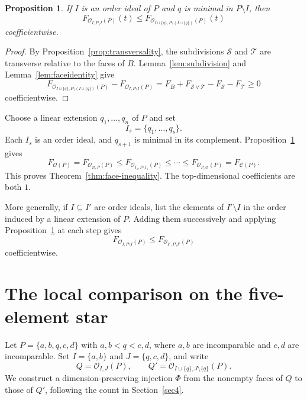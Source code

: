 \documentclass[a4paper,12pt]{amsart}
\newtheorem{proposition}[theorem]{Proposition}
\theoremstyle{definition}
\theoremstyle{remark}
\newcommand{\OO}{\mathcal O}
\newcommand{\CC}{\mathcal C}
\begin{document}
\begin{proposition}\label{prop:step}
If $I$ is an order ideal of $P$ and $q$ is minimal in $P\setminus I$, then
\[
 F_{\OO_{I,P\setminus I}(P)}(t)  \leq  F_{\OO_{I\cup\{q\},P\setminus(I\cup\{q\})}(P)}(t)
\]
coefficientwise.
\end{proposition}

\begin{proof}
By Proposition~\ref{prop:transversality}, the subdivisions $\mathcal S$ and $\mathcal T$ are transverse relative to the faces of $B$.
Lemma~\ref{lem:subdivision} and Lemma~\ref{lem:faceidentity} give
\[
 F_{\OO_{I\cup\{q\},P\setminus(I\cup\{q\})}(P)}-F_{\OO_{I,P\setminus I}(P)}
 =  F_B+F_{\mathcal S\vee\mathcal T}  -F_{\mathcal S}-F_{\mathcal T}  \geq0
\]
coefficientwise.
\end{proof}

Choose a linear extension $q_1,\ldots,q_n$ of $P$ and set
\[
 I_s=\{q_1,\ldots,q_s\}.
\]
Each $I_s$ is an order ideal, and $q_{s+1}$ is minimal in its complement.
Proposition~\ref{prop:step} gives
\[
 F_{\OO(P)}  =  F_{\OO_{\varnothing,P}(P)}  \leq  F_{\OO_{I_1,P\setminus I_1}(P)}  
 \leq\cdots\leq  F_{\OO_{P,\varnothing}(P)}  = F_{\CC(P)}.
\]
This proves Theorem~\ref{thm:face-inequality}.
The top-dimensional coefficients are both $1$.

More generally, if $I\subseteq I'$ are order ideals, list the elements of $I'\setminus I$ in the order induced by a linear extension of $P$.
Adding them successively and applying Proposition~\ref{prop:step} at each step gives
\[
 F_{\OO_{I,P\setminus I}(P)}\leq F_{\OO_{I',P\setminus I'}(P)}
\]
coefficientwise.

\section{The local comparison on the five-element star}
\label{sec7}

Let $P=\{a,b,q,c,d\}$ with $a,b<q<c,d$, where $a,b$ are incomparable and $c,d$ are incomparable.
Set $I=\{a,b\}$ and $J=\{q,c,d\}$, and write
\[
 Q=\OO_{I,J}(P),\qquad Q'=\OO_{I\cup\{q\},J\setminus\{q\}}(P).
\]
We construct a dimension-preserving injection $\Phi$ from the nonempty faces of $Q$ to those of $Q'$, following the count in Section~\ref{sec4}.
\end{document}
